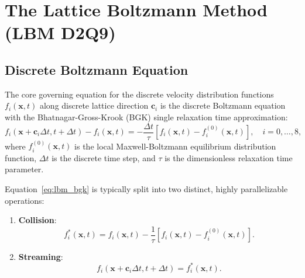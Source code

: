 \documentclass[11pt,a4paper]{article}
\begin{document}
\section{The Lattice Boltzmann Method (LBM D2Q9)}

\subsection{Discrete Boltzmann Equation}
The core governing equation for the discrete velocity distribution functions $f_i(\mathbf{x}, t)$ along discrete lattice direction $\mathbf{c}_i$ is the discrete Boltzmann equation with the Bhatnagar-Gross-Krook (BGK) single relaxation time approximation:
\begin{equation}
f_i(\mathbf{x} + \mathbf{c}_i \Delta t, t + \Delta t) - f_i(\mathbf{x}, t) = -\frac{\Delta t}{\tau} \left[ f_i(\mathbf{x}, t) - f_i^{(0)}(\mathbf{x}, t) \right], \quad i = 0, \dots, 8,
\label{eq:lbm_bgk}
\end{equation}
where $f_i^{(0)}(\mathbf{x}, t)$ is the local Maxwell-Boltzmann equilibrium distribution function, $\Delta t$ is the discrete time step, and $\tau$ is the dimensionless relaxation time parameter.

Equation~\eqref{eq:lbm_bgk} is typically split into two distinct, highly parallelizable operations:
\begin{enumerate}
    \item \textbf{Collision}:
    \begin{equation}
    f_i^*(\mathbf{x}, t) = f_i(\mathbf{x}, t) - \frac{1}{\tau} \left[ f_i(\mathbf{x}, t) - f_i^{(0)}(\mathbf{x}, t) \right].
    \end{equation}
    \item \textbf{Streaming}:
    \begin{equation}
    f_i(\mathbf{x} + \mathbf{c}_i \Delta t, t + \Delta t) = f_i^*(\mathbf{x}, t).
    \end{equation}
\end{enumerate}
\end{document}
